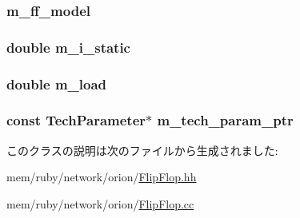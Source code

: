 \hypertarget{classFlipFlop_ae11ee233b7ee30f8d01fb91933cda856}{
\subsubsection[{m\_\-ff\_\-model}]{ {\bf m\_\-ff\_\-model}}}
\label{classFlipFlop_ae11ee233b7ee30f8d01fb91933cda856}
\hypertarget{classFlipFlop_a16f0c9e5942378eab4d83da3c61aba7f}{
\subsubsection[{m\_\-i\_\-static}]{\setlength{\rightskip}{0pt plus 5cm}double {\bf m\_\-i\_\-static}}}
\label{classFlipFlop_a16f0c9e5942378eab4d83da3c61aba7f}
\hypertarget{classFlipFlop_a495601dc4e702bab2bfd4ac968bfbb5c}{
\subsubsection[{m\_\-load}]{\setlength{\rightskip}{0pt plus 5cm}double {\bf m\_\-load}}}
\label{classFlipFlop_a495601dc4e702bab2bfd4ac968bfbb5c}
\hypertarget{classFlipFlop_a11d1644aa2bfe0e16783dface6fadf13}{
\subsubsection[{m\_\-tech\_\-param\_\-ptr}]{\setlength{\rightskip}{0pt plus 5cm}const {\bf TechParameter}$\ast$ {\bf m\_\-tech\_\-param\_\-ptr}}}
\label{classFlipFlop_a11d1644aa2bfe0e16783dface6fadf13}


このクラスの説明は次のファイルから生成されました:\begin{DoxyCompactItemize}
\item 
mem/ruby/network/orion/\hyperlink{FlipFlop_8hh}{FlipFlop.hh}\item 
mem/ruby/network/orion/\hyperlink{FlipFlop_8cc}{FlipFlop.cc}\end{DoxyCompactItemize}
